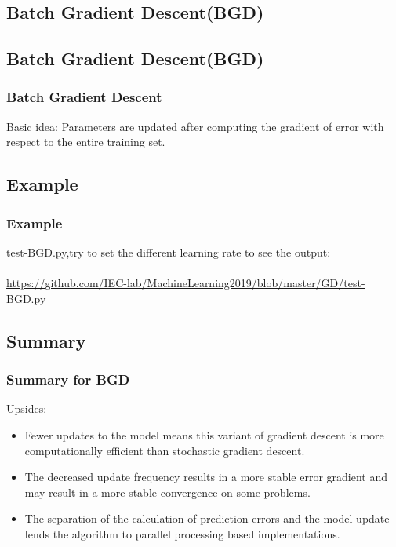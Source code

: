 \documentclass[cjk]{beamer}
\begin{document}
\begin{CJK*}{GBK}{kai}
\section{Batch Gradient Descent(BGD)}
\subsection{Batch Gradient Descent(BGD)}

\begin{frame}
\frametitle{Batch Gradient Descent}
	\begin{block}{Basic idea:}
	Parameters are updated after computing the gradient of error with respect to the entire training set.
	\end{block}
\end{frame}

\subsection{Example}
\begin{frame}
\frametitle{Example}
test-BGD.py,try to set the different learning rate to see the output:\\
~\\
\url{https://github.com/IEC-lab/MachineLearning2019/blob/master/GD/test-BGD.py}
\end{frame}

\subsection{Summary}
\begin{frame}
\frametitle{Summary for BGD}
Upsides:
	\begin{itemize}
	\item Fewer updates to the model means this variant of gradient descent is more computationally efficient than stochastic gradient descent.
	\item The decreased update frequency results in a more stable error gradient and may result in a more stable convergence on some problems.
	\item The separation of the calculation of prediction errors and the model update lends the algorithm to parallel processing based implementations.
	\end{itemize}
\end{frame}


\end{CJK*}
\end{document}
